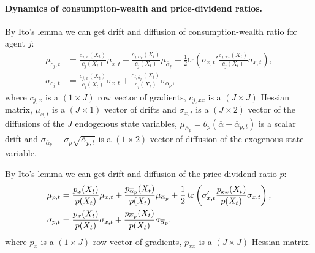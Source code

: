 \paragraph{Dynamics of consumption-wealth and price-dividend ratios.}
By Ito's lemma we can get drift and diffusion of consumption-wealth ratio for agent $ j $:
\begin{align}
	\mu_{c_{j},t}&=\frac{c_{j,x}(X_t)}{c_j(X_t)}\mu_{x,t}+\frac{c_{j,\overline{\alpha}_p}(X_t)}{c_j(X_t)}\mu_{\overline{\alpha}_p}+
	\frac{1}{2}\text{tr}\left(\sigma_{x,t}'\frac{c_{j,xx}(X_t)}{c_j(X_t)}\sigma_{x,t}\right)\label{eq:mu-cj},\\%
	\sigma_{c_j,t}&=\frac{c_{j,x}(X_t)}{c_j(X_t)} \sigma_{x,t} + \frac{c_{j,{\overline{\alpha}_p}}(X_t)}{c_j(X_t)}\sigma_{\overline{\alpha}_p}, \label{eq:sigma-cj}
\end{align}
where $ c_{j,x} $ is a $ (1\times J )$ row vector of gradients, $ c_{j,xx} $ is a $ (J\times J) $ Hessian matrix, $ \mu_{x,t} $ is a $ (J\times 1) $ vector of drifts and $ \sigma_{x,t} $ is a $ (J\times2) $ vector of the diffusions of the $ J $ endogenous state variables, $\mu_{\overline{\alpha}_p}= \theta_p\left(\overline{\alpha}-\overline{\alpha}_{p,t}\right) $ is a scalar drift and $ \sigma_{\overline{\alpha}_p}\equiv \sigma_{p} \sqrt{\overline{\alpha}_{p,t}} $ is a $ (1\times 2) $ vector of diffusion of the exogenous state variable.

By Ito's lemma we can get drift and diffusion of the price-dividend ratio $ p $:
\begin{align}
	\mu_{p,t}&=\frac{p_x(X_t)}{p(X_t)}\mu_{x,t}+\frac{p_{\overline{\alpha}_p}(X_t)}{p(X_t)}\mu_{\overline{\alpha}_p}+\frac{1}{2}\operatorname{tr}\left(\sigma_{x,t}'\frac{p_{xx}(X_t)}{p(X_t)}\sigma_{x,t}\right),\\
	\sigma_{p,t} &= \frac{p_x(X_t)}{p(X_t)} \sigma_{x,t} + \frac{p_{\overline{\alpha}_p}(X_t)}{p(X_t)} \sigma_{\overline{\alpha}_p}. 
\end{align}
where $ p_{x} $ is a $ (1\times J) $ row vector of gradients, $ p_{xx} $ is a $ (J\times J) $ Hessian matrix. 


